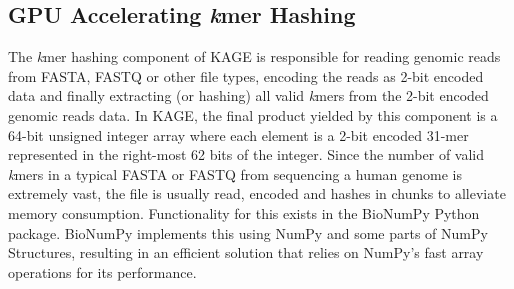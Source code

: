 \subsection{GPU Accelerating \textit{k}mer Hashing}
The \textit{k}mer hashing component of KAGE is responsible for reading genomic reads from FASTA, FASTQ or other file types, encoding the reads as 2-bit encoded data and finally extracting (or hashing) all valid \textit{k}mers from the 2-bit encoded genomic reads data.
In KAGE, the final product yielded by this component is a 64-bit unsigned integer array where each element is a 2-bit encoded 31-mer represented in the right-most 62 bits of the integer.
Since the number of valid \textit{k}mers in a typical FASTA or FASTQ from sequencing a human genome is extremely vast, the file is usually read, encoded and hashes in chunks to alleviate memory consumption.
Functionality for this exists in the BioNumPy Python package.
BioNumPy implements this using NumPy and some parts of NumPy Structures, resulting in an efficient solution that relies on NumPy's fast array operations for its performance.
